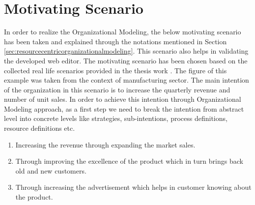 \chapter{Motivating Scenario}
\label{chap:motivatingScenario}

In order to realize the Organizational Modeling, the below motivating scenario has been taken and explained through the notations mentioned in Section \ref{sec:resourcecentricorganizationalmodeling}. This scenario also helps in validating the developed web editor. The motivating scenario has been chosen based on the collected real life scenarios provided in the thesis work \cite{Sierr2015}. The figure of this example was taken from the context of manufacturing sector. The main intention of the organization in this scenario is to increase the quarterly revenue and number of unit sales. In order to achieve this intention through Organizational Modeling approach, as a first step we need to break the intention from abstract level into concrete levels like strategies, sub-intentions, process definitions, resource definitions etc. 
\begin{enumerate}
	\item Increasing the revenue through expanding the market sales. 
	\item Through improving the excellence of the product which in turn brings back old and new customers.
	\item Through increasing the advertisement which helps in customer knowing about the product.
\end{enumerate}

